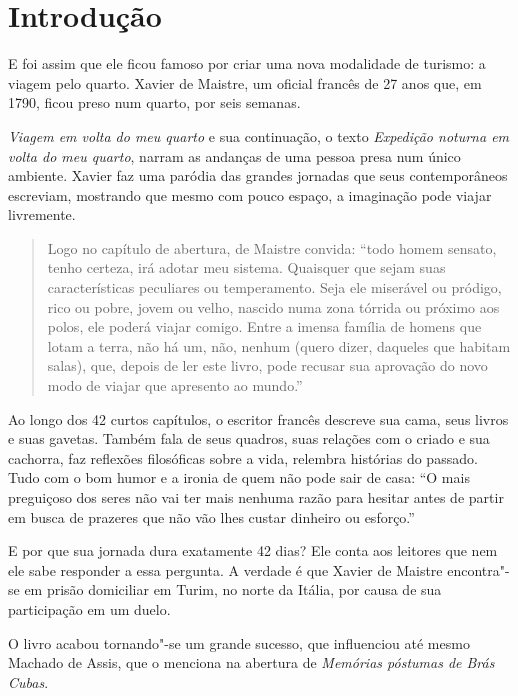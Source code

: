 \documentclass[12pt]{extarticle}
\begin{document}
\tableofcontents


\section{Introdução}

E foi assim que ele ficou famoso por criar uma nova modalidade de turismo: a viagem pelo quarto.
Xavier de Maistre, um oficial francês de 27 anos que, em 1790, ficou preso num quarto, por seis semanas.



\textit{Viagem em volta do meu quarto} e sua continuação, o texto 
\textit{Expedição noturna em volta do meu quarto}, narram as andanças de uma pessoa presa num único ambiente. 
Xavier faz uma paródia das grandes jornadas que seus contemporâneos escreviam, 
mostrando que mesmo com pouco espaço, a imaginação pode viajar livremente.

\begin{quote}
Logo no capítulo de abertura, de Maistre convida: ``todo homem sensato, tenho certeza, irá adotar meu sistema. 
Quaisquer que sejam suas características peculiares ou temperamento. Seja ele miserável ou pródigo, rico ou pobre, jovem ou velho, nascido numa zona tórrida ou próximo aos polos, ele poderá viajar comigo. Entre a imensa família de homens que lotam a terra, não há um, não, nenhum (quero dizer, daqueles que habitam salas), que, depois de ler este livro, pode recusar sua aprovação do novo modo de viajar que apresento ao mundo.''
\end{quote}

Ao longo dos 42 curtos capítulos, o escritor francês descreve sua cama, 
seus livros e suas gavetas. Também fala de seus quadros, suas relações com o criado e 
sua cachorra, faz reflexões filosóficas sobre a vida, relembra histórias do passado. 
Tudo com o bom humor e a ironia de quem não pode sair de casa: ``O mais preguiçoso dos 
seres não vai ter mais nenhuma razão para hesitar antes de partir em busca de prazeres que não vão lhes custar dinheiro ou esforço.''

E por que sua jornada dura exatamente 42 dias? Ele conta aos leitores que nem ele sabe responder a essa pergunta. A verdade é que Xavier de Maistre encontra"-se em prisão domiciliar em Turim, no norte da Itália, por causa de sua participação em um duelo. 

O livro acabou tornando"-se um grande sucesso, que influenciou até mesmo Machado de Assis, 
que o menciona na abertura de \textit{Memórias póstumas de Brás Cubas}.
\end{document}
